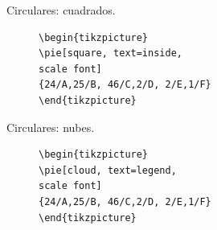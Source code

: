\documentclass[dvipsnames,xcolor=x11names]{beamer}
\theoremstyle{plain}
\theoremstyle{definition}
\begin{document}
\begin{frame}[fragile]{Circulares: cuadrados.}
\begin{figure}
\begin{minipage}{0.4\linewidth}
\hspace*{-3cm}\begin{scriptsize}
\begin{verbatim}
\begin{tikzpicture}
\pie[square, text=inside,
scale font]
{24/A,25/B, 46/C,2/D, 2/E,1/F}
\end{tikzpicture}
\end{verbatim}
\end{scriptsize}
\end{minipage}
\begin{minipage}{0.4\linewidth}
\centering
{}
\end{minipage}
    \end{figure}
\end{frame}

\begin{frame}[fragile]{Circulares: nubes.}
\begin{figure}
\begin{minipage}{0.4\linewidth}
\hspace*{-5cm}\begin{scriptsize}
\begin{verbatim}
\begin{tikzpicture}
\pie[cloud, text=legend,
scale font]
{24/A,25/B, 46/C,2/D, 2/E,1/F}
\end{tikzpicture}
\end{verbatim}
\end{scriptsize}
\end{minipage}
\begin{minipage}{0.4\linewidth}
\centering
{}
\end{minipage}
    \end{figure}
\end{frame}
\end{document}

